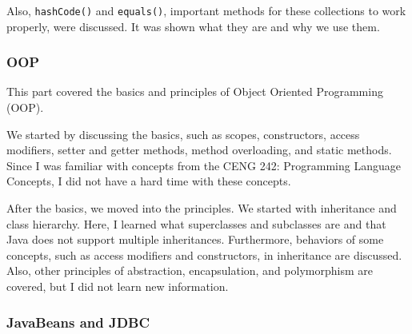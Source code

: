 \begin{figure}[h!]
  \centering
\end{figure}

Also, \texttt{hashCode()} and \texttt{equals()}, important methods for these collections to work properly, were discussed. It was shown what they are and why we use them.

\subsubsection{OOP}

This part covered the basics and principles of Object Oriented Programming (OOP).

We started by discussing the basics, such as scopes, constructors, access modifiers, setter and getter methods, method overloading, and static methods. Since I was familiar with concepts from the CENG 242: Programming Language Concepts, I did not have a hard time with these concepts.

After the basics, we moved into the principles. We started with inheritance and class hierarchy. Here, I learned what superclasses and subclasses are and that Java does not support multiple inheritances. Furthermore, behaviors of some concepts, such as access modifiers and constructors, in inheritance are discussed. Also, other principles of abstraction, encapsulation, and polymorphism are covered, but I did not learn new information.

\subsubsection{JavaBeans and JDBC}

